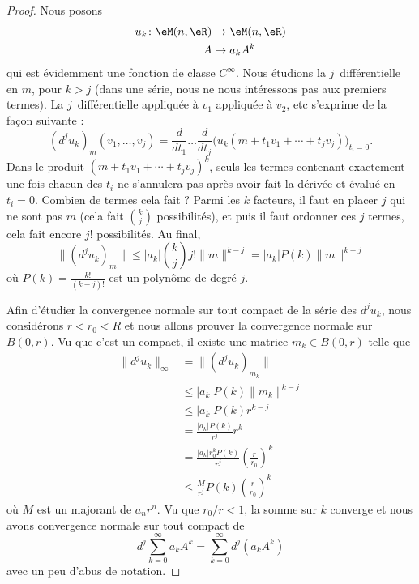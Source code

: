 \begin{proof}
    Nous posons
    \begin{equation}
        \begin{aligned}
            u_k\colon \eM(n,\eR)&\to \eM(n,\eR) \\
            A&\mapsto a_kA^k
        \end{aligned}
    \end{equation}
    qui est évidemment une fonction de classe \(  C^{\infty}\). Nous étudions la \( j\)\ieme\ différentielle en \( m\), pour \( k>j\) (dans une série, nous ne nous intéressons pas aux premiers termes). La \( j\)\ieme\ différentielle appliquée à \( v_1\) appliquée à \( v_2\), etc s'exprime de la façon suivante :
    \begin{equation}
        (d^ju_k)_m(v_1,\ldots, v_j)=\frac{ d  }{ d t_1 }\ldots\frac{ d  }{ d t_j }\Big( u_k(m+t_1v_1+\cdots +t_jv_j)    \Big)_{t_i=0}.
    \end{equation}
    Dans le produit \( (m+t_1v_1+\cdots +t_jv_j)^k\), seuls les termes contenant exactement une fois chacun des \( t_i\) ne s'annulera pas après avoir fait la dérivée et évalué en \( t_i=0\). Combien de termes cela fait ? Parmi les \( k\) facteurs, il faut en placer \( j\) qui ne sont pas \( m\) (cela fait \( \binom{ k }{ j }\) possibilités), et puis il faut ordonner ces \( j\) termes, cela fait encore \( j!\) possibilités. Au final,
    \begin{equation}
        \| (d^ju_k)_m \|\leq | a_k | \binom{ k }{ j }j!\| m \|^{k-j}=| a_k |P(k)\| m \|^{k-j}
    \end{equation}
    où \( P(k)=\frac{ k! }{ (k-j)! }\) est un polynôme de degré \( j\).

    Afin d'étudier la convergence normale sur tout compact de la série des \( d^ju_k\), nous considérons \( r<r_0<R\) et nous allons prouver la convergence normale sur \( \overline{ B(0,r) }\). Vu que c'est un compact, il existe une matrice \( m_k\in\overline{ B(0,r) }\) telle que
    \begin{subequations}
        \begin{align}
            \| d^ju_k \|_{\infty}&=\| (d^ju_k)_{m_k} \|\\
            &\leq | a_k |P(k)\| m_k \|^{k-j}\\
            &\leq | a_k |P(k)r^{k-j}\\
            &=\frac{ | a_k |P(k) }{ r^j }r^k\\
            &=\frac{ | a_k |r_0^kP(k) }{ r^j }\left( \frac{ r }{ r_0 } \right)^k\\
            &\leq \frac{ M }{ r^j }P(k)\left( \frac{ r }{ r_0 } \right)^k
        \end{align}
    \end{subequations}
    où \( M\) est un majorant de \( a_nr^n\). Vu que \( r_0/r<1\), la somme sur \( k\) converge et nous avons convergence normale sur tout compact de
    \begin{equation}
        d^j\sum_{k=0}^{\infty}a_kA^k=\sum_{k=0}^{\infty}d^j(a_kA^k)
    \end{equation}
    avec un peu d'abus de notation.
\end{proof}

